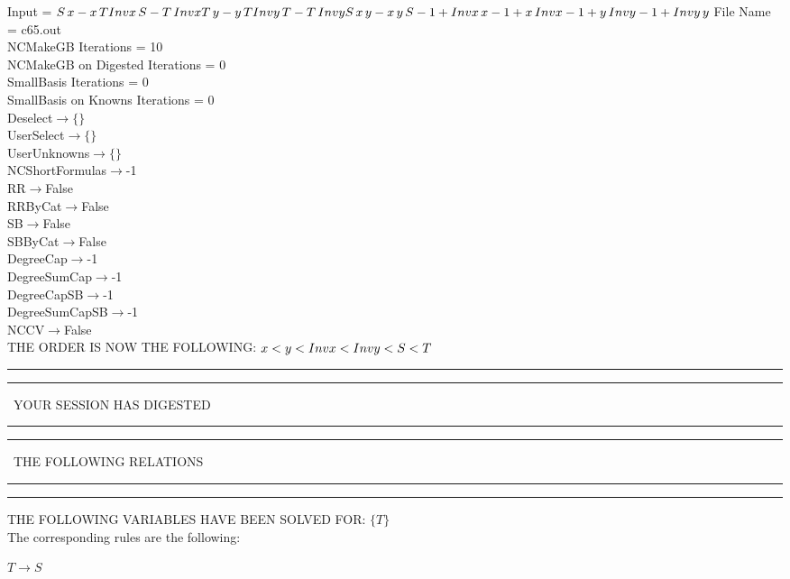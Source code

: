 \documentclass[rep10,leqno]{report}
\begin{document}
\normalsize
\baselineskip=12pt
\noindent
Input = 
$
\\S\,
 x - x\,
 T\\
Invx\,
 S - T\,
 Invx\\
T\,
 y - y\,
 T\\
Invy\,
 T - T\,
 Invy\\
S\,
 x\,
 y - x\,
 y\,
 S\\
-1 + Invx\,
 x\\
-1 + x\,
 Invx\\
-1 + y\,
 Invy\\
-1 + Invy\,
 y\\
$
File Name = c65.out\\
NCMakeGB Iterations = 10\\
NCMakeGB on Digested Iterations = 0\\
SmallBasis Iterations = 0\\
SmallBasis on Knowns Iterations = 0\\
Deselect$\rightarrow \{\}$\\
UserSelect$\rightarrow \{\}$\\
UserUnknowns$\rightarrow \{\}$\\
NCShortFormulas$\rightarrow$-1\\
RR$\rightarrow $False\\
RRByCat$\rightarrow $False\\
SB$\rightarrow $False\\
SBByCat$\rightarrow $False\\
DegreeCap$\rightarrow $-1\\
DegreeSumCap$\rightarrow $-1\\
DegreeCapSB$\rightarrow $-1\\
DegreeSumCapSB$\rightarrow $-1\\
NCCV$\rightarrow $False\\
THE ORDER IS NOW THE FOLLOWING:\hfil\break
$
x<y<Invx<Invy<S<T\\
$
\rule[2pt]{6in}{4pt}\hfil\break
\rule[2pt]{1.879in}{4pt}
\ YOUR SESSION HAS DIGESTED\ 
\rule[2pt]{1.879in}{4pt}\hfil\break
\rule[2pt]{1.923in}{4pt}
\ THE FOLLOWING RELATIONS\ 
\rule[2pt]{1.923in}{4pt}\hfil\break
\rule[2pt]{6in}{4pt}\hfil\break
THE FOLLOWING VARIABLES HAVE BEEN SOLVED FOR:\hfil\break
$\{T\}$
\smallskip\\
The corresponding rules are the following:\smallskip\\
\begin{minipage}{6in}
$
T\rightarrow S
$
\end{minipage}\medskip\\
\end{document}
